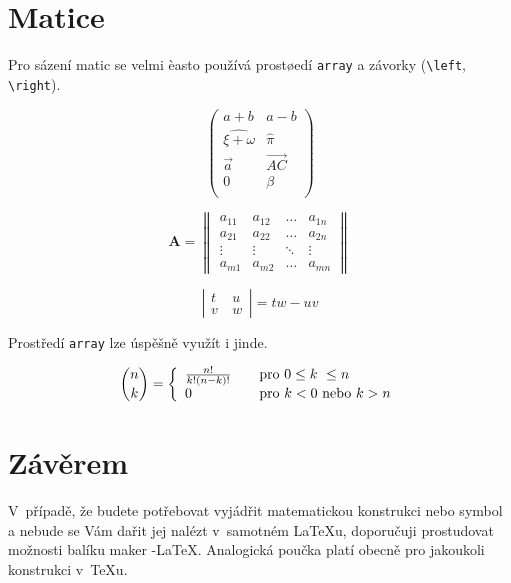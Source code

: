 \documentclass[a4paper, 11pt]{article}
\theoremstyle{definition} %
\begin{document}
\section{Matice}

Pro sázení matic se velmi èasto používá prostøedí \texttt{array} a závorky  (\verb|\left|, \verb|\right|). 

 $$\left( \begin{array}{cc}
a + b & a - b \\
\widehat{\xi + \omega} & \hat{\pi} \\
\vec{a} & \overrightarrow{AC} \\
0 & \beta\\
\end{array} \right)$$

$$\mathbf{A}=\left\|\begin{array}{cccc}
a_{11} & a_{12} & \ldots & a_{1n} \\
a_{21} & a_{22} & \ldots & a_{2n} \\
\vdots & \vdots & \ddots & \vdots \\
a_{m1} & a_{m2} & \ldots & a_{mn}
\end{array}\right\|$$

$$\left|\begin{array}{cc}
t & u~\\ v~& w
\end{array}\right| = tw -uv$$


Prostředí \texttt{array} lze úspěšně využít i jinde.

$$\binom{n}{k} = \left\{ 
\begin{array}{l l}
  \frac{n!}{k!(n-k)!} & \quad \mbox{pro $0 \leq k~\leq n$}\\
  0 & \quad \mbox{pro $k < 0$ nebo $k > n$}\\
\end{array} \right. $$

\section{Závěrem}

V~případě, že budete potřebovat vyjádřit matematickou konstrukci nebo symbol a nebude se Vám dařit jej nalézt v~samotném \LaTeX u, doporučuji prostudovat možnosti balíku maker \AmS-\LaTeX. 
Analogická poučka platí obecně pro jakoukoli konstrukci v~\TeX u.
\end{document}
